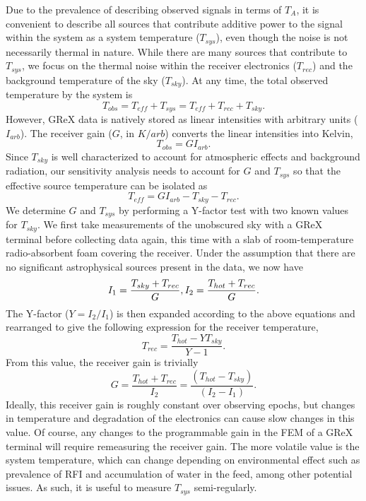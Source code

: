 Due to the prevalence of describing observed signals in terms of $T_{A}$, it is convenient to describe all sources that contribute additive power to the signal within the system as a system temperature ($T_{sys}$), even though the noise is not necessarily thermal in nature. 
While there are many sources that contribute to $T_{sys}$, we focus on the thermal noise within the receiver electronics ($T_{rec}$) and the background temperature of the sky ($T_{sky}$). 
At any time, the total observed temperature by the system is
\begin{equation}
    T_{obs}=T_{eff}+T_{sys}=T_{eff}+T_{rec}+T_{sky}.
\end{equation}
However, GReX data is natively stored as linear intensities with arbitrary units ($I_{arb}$). 
The receiver gain ($G$, in $K/arb$) converts the linear intensities into Kelvin,
\begin{equation}
    T_{obs}=GI_{arb}.
\end{equation}
Since $T_{sky}$ is well characterized to account for atmospheric effects and background radiation, our sensitivity analysis needs to account for $G$ and $T_{sys}$ so that the effective source temperature can be isolated as
\begin{equation}
    T_{eff}=GI_{arb}-T_{sky}-T_{rec}.
\end{equation}
We determine $G$ and $T_{sys}$ by performing a Y-factor test with two known values for $T_{sky}$.
We first take measurements of the unobscured sky with a GReX terminal before collecting data again, this time with a slab of room-temperature radio-absorbent foam covering the receiver. 
Under the assumption that there are no significant astrophysical sources present in the data, we now have 
\begin{equation}
    I_1=\frac{T_{sky}+T_{rec}}{G},\\
    I_2=\frac{T_{hot}+T_{rec}}{G}.
\end{equation}
The Y-factor ($Y=I_2/I_1$) is then expanded according to the above equations and rearranged to give the following expression for the receiver temperature,
\begin{equation}
    T_{rec}=\frac{T_{hot}-YT_{sky}}{Y-1}.\label{eq:Trec}
\end{equation}
From this value, the receiver gain is trivially
\begin{equation}
    G=\frac{T_{hot}+T_{rec}}{I_2}=\frac{(T_{hot}-T_{sky})}{(I_2-I_1)}.\label{eq:gain}
\end{equation}
Ideally, this receiver gain is roughly constant over observing epochs, but changes in temperature and degradation of the electronics can cause slow changes in this value. 
Of course, any changes to the programmable gain in the FEM of a GReX terminal will require remeasuring the receiver gain. 
The more volatile value is the system temperature, which can change depending on environmental effect such as prevalence of RFI and accumulation of water in the feed, among other potential issues. 
As such, it is useful to measure $T_{sys}$ semi-regularly. 

